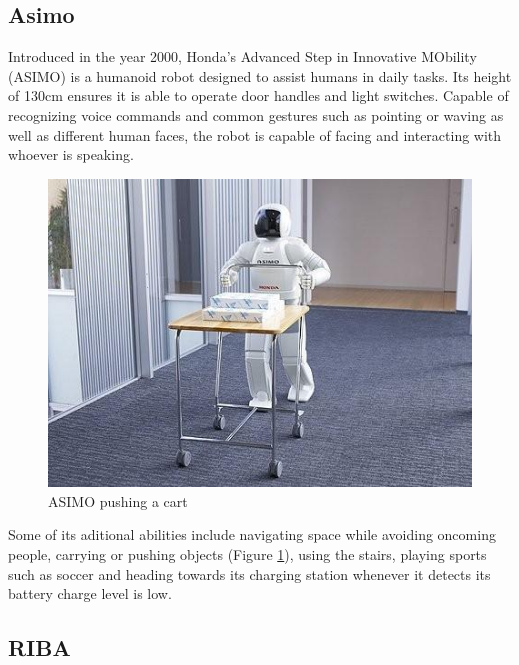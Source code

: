 
\subsection{Asimo}

Introduced in the year 2000, Honda's Advanced Step in Innovative MObility (ASIMO) is a humanoid robot designed to assist humans in daily tasks. Its height of 130cm ensures it is able to operate door handles and light switches. Capable of recognizing voice commands and common gestures such as pointing or waving as well as different human faces, the robot is capable of facing and interacting with whoever is speaking. \\


	\begin{figure}[H]
			\centering
			\includegraphics[scale=0.7]{images/StateOfArt/asimo.jpg}
			\caption{ASIMO pushing a cart}
			\label{asimo}
	\end{figure}
	\bigskip

Some of its aditional abilities include navigating space while avoiding oncoming people, carrying or pushing objects (Figure \ref{asimo}), using the stairs, playing sports such as soccer and heading towards its charging station whenever it detects its battery charge level is low.\\

\newpage
\subsection{RIBA}

